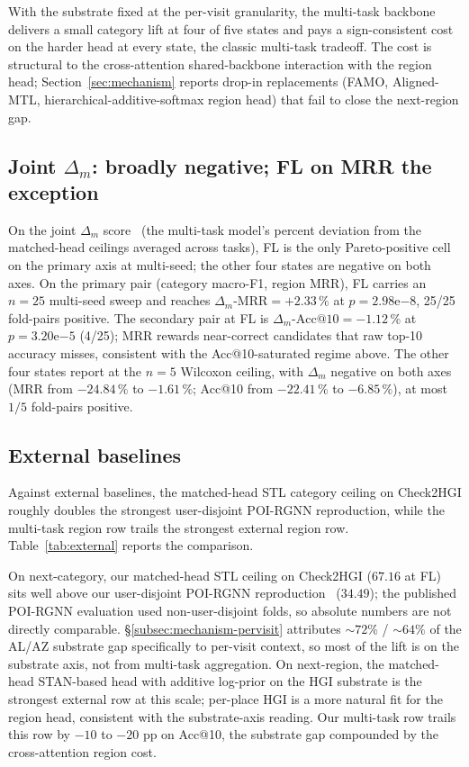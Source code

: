 With the substrate fixed at the per-visit granularity, the multi-task backbone delivers a small category lift at four of five states and pays a sign-consistent cost on the harder head at every state, the classic multi-task tradeoff. The cost is structural to the cross-attention shared-backbone interaction with the region head; Section~\ref{sec:mechanism} reports drop-in replacements (FAMO, Aligned-MTL, hierarchical-additive-softmax region head) that fail to close the next-region gap.

\subsection{Joint $\Delta_m$: broadly negative; FL on MRR the exception}
\label{subsec:results-deltam}

On the joint $\Delta_m$ score~\cite{maninis2019attentive,vandenhende2022mtl} (the multi-task model's percent deviation from the matched-head ceilings averaged across tasks), FL is the only Pareto-positive cell on the primary axis at multi-seed; the other four states are negative on both axes. On the primary pair (category macro-F1, region MRR), FL carries an $n=25$ multi-seed sweep and reaches $\Delta_m\text{-MRR}=+2.33\,\%$ at $p=2.98\mathrm{e}{-8}$, 25/25 fold-pairs positive. The secondary pair at FL is $\Delta_m\text{-Acc@10}=-1.12\,\%$ at $p=3.20\mathrm{e}{-5}$ (4/25); MRR rewards near-correct candidates that raw top-10 accuracy misses, consistent with the Acc@10-saturated regime above. The other four states report at the $n=5$ Wilcoxon ceiling, with $\Delta_m$ negative on both axes (MRR from $-24.84\,\%$ to $-1.61\,\%$; Acc@10 from $-22.41\,\%$ to $-6.85\,\%$), at most $1/5$ fold-pairs positive.

\subsection{External baselines}
\label{subsec:results-external}

Against external baselines, the matched-head STL category ceiling on Check2HGI roughly doubles the strongest user-disjoint POI-RGNN reproduction, while the multi-task region row trails the strongest external region row. Table~\ref{tab:external} reports the comparison.



On next-category, our matched-head STL ceiling on Check2HGI ($67.16$ at FL) sits well above our user-disjoint POI-RGNN reproduction~\cite{capanema2023poirgnn} ($34.49$); the published POI-RGNN evaluation used non-user-disjoint folds, so absolute numbers are not directly comparable. \S\ref{subsec:mechanism-pervisit} attributes ${\sim}72\%$ / ${\sim}64\%$ of the AL/AZ substrate gap specifically to per-visit context, so most of the lift is on the substrate axis, not from multi-task aggregation. On next-region, the matched-head STAN-based head with additive log-prior on the HGI substrate is the strongest external row at this scale; per-place HGI is a more natural fit for the region head, consistent with the substrate-axis reading. Our multi-task row trails this row by $-10$ to $-20$ pp on Acc@10, the substrate gap compounded by the cross-attention region cost.
